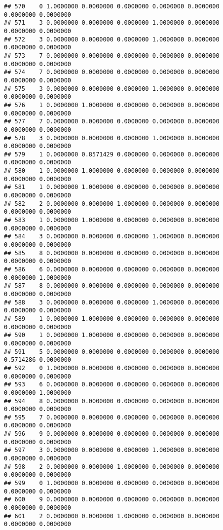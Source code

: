 \documentclass[
]{article}
\begin{document}
\begin{verbatim}
## 570    0 1.0000000 0.0000000 0.0000000 0.0000000 0.0000000 0.0000000 0.0000000
## 571    3 0.0000000 0.0000000 0.0000000 1.0000000 0.0000000 0.0000000 0.0000000
## 572    3 0.0000000 0.0000000 0.0000000 1.0000000 0.0000000 0.0000000 0.0000000
## 573    7 0.0000000 0.0000000 0.0000000 0.0000000 0.0000000 0.0000000 0.0000000
## 574    7 0.0000000 0.0000000 0.0000000 0.0000000 0.0000000 0.0000000 0.0000000
## 575    3 0.0000000 0.0000000 0.0000000 1.0000000 0.0000000 0.0000000 0.0000000
## 576    1 0.0000000 1.0000000 0.0000000 0.0000000 0.0000000 0.0000000 0.0000000
## 577    7 0.0000000 0.0000000 0.0000000 0.0000000 0.0000000 0.0000000 0.0000000
## 578    3 0.0000000 0.0000000 0.0000000 1.0000000 0.0000000 0.0000000 0.0000000
## 579    1 0.0000000 0.8571429 0.0000000 0.0000000 0.0000000 0.0000000 0.0000000
## 580    1 0.0000000 1.0000000 0.0000000 0.0000000 0.0000000 0.0000000 0.0000000
## 581    1 0.0000000 1.0000000 0.0000000 0.0000000 0.0000000 0.0000000 0.0000000
## 582    2 0.0000000 0.0000000 1.0000000 0.0000000 0.0000000 0.0000000 0.0000000
## 583    1 0.0000000 1.0000000 0.0000000 0.0000000 0.0000000 0.0000000 0.0000000
## 584    3 0.0000000 0.0000000 0.0000000 1.0000000 0.0000000 0.0000000 0.0000000
## 585    8 0.0000000 0.0000000 0.0000000 0.0000000 0.0000000 0.0000000 0.0000000
## 586    6 0.0000000 0.0000000 0.0000000 0.0000000 0.0000000 0.0000000 1.0000000
## 587    8 0.0000000 0.0000000 0.0000000 0.0000000 0.0000000 0.0000000 0.0000000
## 588    3 0.0000000 0.0000000 0.0000000 1.0000000 0.0000000 0.0000000 0.0000000
## 589    1 0.0000000 1.0000000 0.0000000 0.0000000 0.0000000 0.0000000 0.0000000
## 590    1 0.0000000 1.0000000 0.0000000 0.0000000 0.0000000 0.0000000 0.0000000
## 591    5 0.0000000 0.0000000 0.0000000 0.0000000 0.0000000 0.5714286 0.0000000
## 592    0 1.0000000 0.0000000 0.0000000 0.0000000 0.0000000 0.0000000 0.0000000
## 593    6 0.0000000 0.0000000 0.0000000 0.0000000 0.0000000 0.0000000 1.0000000
## 594    8 0.0000000 0.0000000 0.0000000 0.0000000 0.0000000 0.0000000 0.0000000
## 595    7 0.0000000 0.0000000 0.0000000 0.0000000 0.0000000 0.0000000 0.0000000
## 596    9 0.0000000 0.0000000 0.0000000 0.0000000 0.0000000 0.0000000 0.0000000
## 597    3 0.0000000 0.0000000 0.0000000 1.0000000 0.0000000 0.0000000 0.0000000
## 598    2 0.0000000 0.0000000 1.0000000 0.0000000 0.0000000 0.0000000 0.0000000
## 599    0 1.0000000 0.0000000 0.0000000 0.0000000 0.0000000 0.0000000 0.0000000
## 600    9 0.0000000 0.0000000 0.0000000 0.0000000 0.0000000 0.0000000 0.0000000
## 601    2 0.0000000 0.0000000 1.0000000 0.0000000 0.0000000 0.0000000 0.0000000

\end{verbatim}
\end{document}
